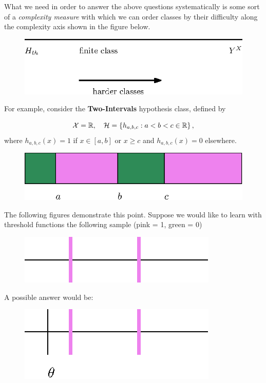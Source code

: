 What we need in order to answer the above questions systematically is some sort of a \textit{complexity measure} with which we can order classes by their difficulty along the complexity axis shown in the figure below.

\begin{figure}[h!]
\centering
\includegraphics[scale=0.6]{complexity_measure.eps}
\end{figure}

For example, consider the \textbf{Two-Intervals} hypothesis class, defined by

\[\mathcal{X} = \mathbb{R}, \quad \mathcal{H} = \{ h_{a,b,c} : a < b < c \in \mathbb{R}\}\,,\]
 where $h_{a,b,c}(x)=1$ if $x \in [a,b]$ or $x\geq c$ and $h_{a,b,c}(x)=0$ elsewhere.

\begin{figure}[h!]
\centering
\includegraphics[scale=0.8]{2_intervals.eps}
\end{figure}



The following figures demonstrate this point. Suppose we would like to learn with threshold functions the following sample  (pink = 1, green = 0)
\begin{figure}[h!]
\centering
\includegraphics[scale=0.6]{VC_threshold_intuitive.eps}
\end{figure}

A possible answer would be:
\begin{figure}[h!]
\centering
\includegraphics[scale=0.6]{VC_threshold_intuitive3.eps}
\end{figure}

